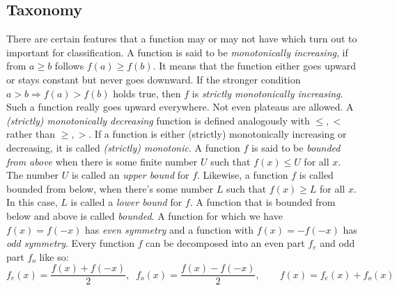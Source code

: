 
\subsection{Taxonomy}
There are certain features that a function may or may not have which turn out to important for classification. A function is said to be \emph{monotonically increasing}, if from $a \geq b$ follows $f(a) \geq f(b)$. It means that the function either goes upward or stays constant but never goes downward. If the stronger condition  $a > b \Rightarrow f(a) > f(b)$ holds true, then $f$ is \emph{strictly monotonically increasing}. Such a function really goes upward everywhere. Not even plateaus are allowed. A \emph{(strictly) monotonically decreasing} function is defined analogously with $\leq, <$ rather than $\geq, >$. If a function is either (strictly) monotonically increasing or decreasing, it is called \emph{(strictly) monotonic}. A function $f$ is said to be \emph{bounded from above} when there is some finite number $U$ such that $f(x) \leq U$ for all $x$. The number $U$ is called an \emph{upper bound} for $f$. Likewise, a function $f$ is called bounded from below, when there's some number $L$ such that $f(x) \geq L$ for all $x$. In this case, $L$ is called a \emph{lower bound} for $f$. A function that is bounded from below and above is called \emph{bounded}. A function for which we have $f(x) = f(-x)$ has \emph{even symmetry} and a function with $f(x) = -f(-x)$ has \emph{odd symmetry}. Every function $f$ can be decomposed into an even part $f_e$ and odd part $f_o$ like so: 
\begin{equation}
\label{Eq:EvenOddFuncDecomp}
f_e(x) = \frac{f(x) + f(-x)}{2}, \;\;
f_o(x) = \frac{f(x) - f(-x)}{2}, \qquad
f(x) = f_e(x) + f_o(x)
\end{equation}
